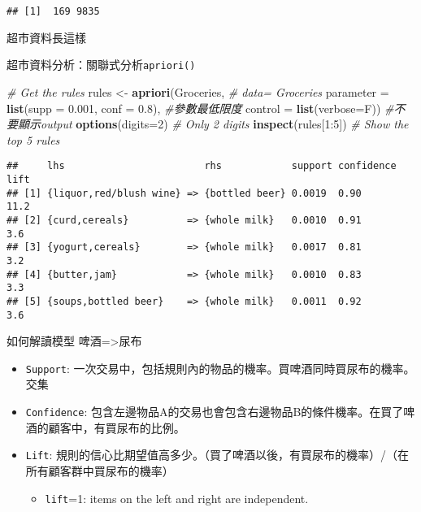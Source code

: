\documentclass[]{book}
\newenvironment{Shaded}{\begin{snugshade}}{\end{snugshade}}
\newcommand{\KeywordTok}[1]{\textcolor[rgb]{0.13,0.29,0.53}{\textbf{{#1}}}}
\newcommand{\DataTypeTok}[1]{\textcolor[rgb]{0.13,0.29,0.53}{{#1}}}
\newcommand{\DecValTok}[1]{\textcolor[rgb]{0.00,0.00,0.81}{{#1}}}
\newcommand{\FloatTok}[1]{\textcolor[rgb]{0.00,0.00,0.81}{{#1}}}
\newcommand{\StringTok}[1]{\textcolor[rgb]{0.31,0.60,0.02}{{#1}}}
\newcommand{\CommentTok}[1]{\textcolor[rgb]{0.56,0.35,0.01}{\textit{{#1}}}}
\newcommand{\NormalTok}[1]{{#1}}
\providecommand{\tightlist}{%
  \setlength{\itemsep}{0pt}\setlength{\parskip}{0pt}}
\begin{document}
\begin{verbatim}
## [1]  169 9835
\end{verbatim}

超市資料長這樣

超市資料分析：關聯式分析\texttt{apriori()}

\begin{Shaded}
\begin{Highlighting}[]
\CommentTok{# Get the rules}
\NormalTok{rules <-}\StringTok{ }\KeywordTok{apriori}\NormalTok{(Groceries, }\CommentTok{# data= Groceries}
                 \DataTypeTok{parameter =} \KeywordTok{list}\NormalTok{(}\DataTypeTok{supp =} \FloatTok{0.001}\NormalTok{, }\DataTypeTok{conf =} \FloatTok{0.8}\NormalTok{), }\CommentTok{#參數最低限度}
                 \DataTypeTok{control =} \KeywordTok{list}\NormalTok{(}\DataTypeTok{verbose=}\NormalTok{F)) }\CommentTok{#不要顯示output}
\KeywordTok{options}\NormalTok{(}\DataTypeTok{digits=}\DecValTok{2}\NormalTok{) }\CommentTok{# Only 2 digits}
\KeywordTok{inspect}\NormalTok{(rules[}\DecValTok{1}\NormalTok{:}\DecValTok{5}\NormalTok{]) }\CommentTok{# Show the top 5 rules}
\end{Highlighting}
\end{Shaded}

\begin{verbatim}
##     lhs                        rhs            support confidence lift
## [1] {liquor,red/blush wine} => {bottled beer} 0.0019  0.90       11.2
## [2] {curd,cereals}          => {whole milk}   0.0010  0.91        3.6
## [3] {yogurt,cereals}        => {whole milk}   0.0017  0.81        3.2
## [4] {butter,jam}            => {whole milk}   0.0010  0.83        3.3
## [5] {soups,bottled beer}    => {whole milk}   0.0011  0.92        3.6
\end{verbatim}

如何解讀模型 啤酒=\textgreater{}尿布

\begin{itemize}
\tightlist
\item
  \texttt{Support}:
  一次交易中，包括規則內的物品的機率。買啤酒同時買尿布的機率。交集
\item
  \texttt{Confidence}:
  包含左邊物品A的交易也會包含右邊物品B的條件機率。在買了啤酒的顧客中，有買尿布的比例。
\item
  \texttt{Lift}:
  規則的信心比期望值高多少。（買了啤酒以後，有買尿布的機率）/（在所有顧客群中買尿布的機率）

  \begin{itemize}
  \tightlist
  \item
    \texttt{lift}=1: items on the left and right are independent.
  \end{itemize}
\end{itemize}
\end{document}

